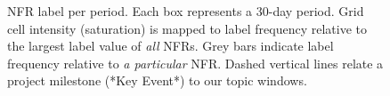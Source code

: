 \documentclass[]{sig-alternate}
\newcommand{\XXX}[1]{\textcolor{red}{{\it \textbf{[XXX: #1]}}}}
\begin{document}
\begin{figure}[ht]
\centering
{}           
                                             
	\caption[]{NFR label per period. Each box represents a 30-day period. %
	Grid cell intensity (saturation) is mapped to label frequency relative to the largest label value of \emph{all} NFRs. Grey bars indicate label frequency relative to \emph{a particular} NFR. Dashed vertical lines relate a project milestone (*Key Event*) to our topic windows. 
}
\label{fig:timelines}
\end{figure}


\end{document}
